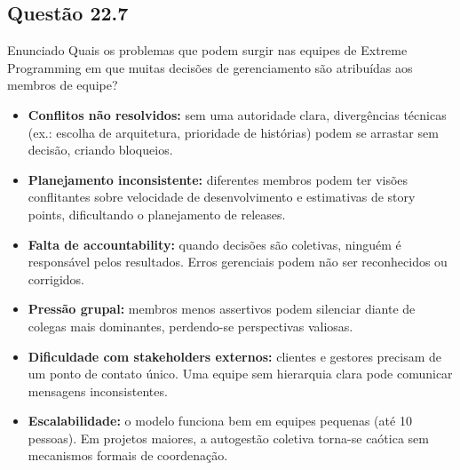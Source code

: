 \documentclass[12pt,a4paper]{article}
\begin{document}
\subsection*{Questão 22.7}
\begin{questao}{Enunciado}
Quais os problemas que podem surgir nas equipes de Extreme Programming em
que muitas decisões de gerenciamento são atribuídas aos membros de equipe?
\end{questao}
\begin{resposta}
\begin{itemize}[nosep]
  \item \textbf{Conflitos não resolvidos:} sem uma autoridade clara,
        divergências técnicas (ex.: escolha de arquitetura, prioridade de
        histórias) podem se arrastar sem decisão, criando bloqueios.
  \item \textbf{Planejamento inconsistente:} diferentes membros podem
        ter visões conflitantes sobre velocidade de desenvolvimento e
        estimativas de story points, dificultando o planejamento de releases.
  \item \textbf{Falta de accountability:} quando decisões são coletivas,
        ninguém é responsável pelos resultados. Erros gerenciais podem não
        ser reconhecidos ou corrigidos.
  \item \textbf{Pressão grupal:} membros menos assertivos podem silenciar
        diante de colegas mais dominantes, perdendo-se perspectivas valiosas.
  \item \textbf{Dificuldade com stakeholders externos:} clientes e gestores
        precisam de um ponto de contato único. Uma equipe sem hierarquia
        clara pode comunicar mensagens inconsistentes.
  \item \textbf{Escalabilidade:} o modelo funciona bem em equipes pequenas
        (até 10 pessoas). Em projetos maiores, a autogestão coletiva torna-se
        caótica sem mecanismos formais de coordenação.
\end{itemize}
\end{resposta}

\end{document}
